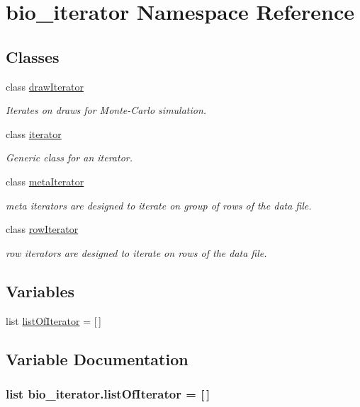 \hypertarget{namespacebio__iterator}{\section{bio\+\_\+iterator Namespace Reference}
\label{namespacebio__iterator}
}
\subsection*{Classes}
\begin{DoxyCompactItemize}
\item 
class \hyperlink{classbio__iterator_1_1draw_iterator}{draw\+Iterator}
\begin{DoxyCompactList}\small\item\em Iterates on draws for Monte-\/\+Carlo simulation. \end{DoxyCompactList}\item 
class \hyperlink{classbio__iterator_1_1iterator}{iterator}
\begin{DoxyCompactList}\small\item\em Generic class for an iterator. \end{DoxyCompactList}\item 
class \hyperlink{classbio__iterator_1_1meta_iterator}{meta\+Iterator}
\begin{DoxyCompactList}\small\item\em meta iterators are designed to iterate on group of rows of the data file. \end{DoxyCompactList}\item 
class \hyperlink{classbio__iterator_1_1row_iterator}{row\+Iterator}
\begin{DoxyCompactList}\small\item\em row iterators are designed to iterate on rows of the data file. \end{DoxyCompactList}\end{DoxyCompactItemize}
\subsection*{Variables}
\begin{DoxyCompactItemize}
\item 
list \hyperlink{namespacebio__iterator_a2d3f53d80176e4d2ece5f09a7d999bf9}{list\+Of\+Iterator} = \mbox{[}$\,$\mbox{]}
\end{DoxyCompactItemize}


\subsection{Variable Documentation}
\hypertarget{namespacebio__iterator_a2d3f53d80176e4d2ece5f09a7d999bf9}{
\subsubsection[{list\+Of\+Iterator}]{\setlength{\rightskip}{0pt plus 5cm}list bio\+\_\+iterator.\+list\+Of\+Iterator = \mbox{[}$\,$\mbox{]}}}\label{namespacebio__iterator_a2d3f53d80176e4d2ece5f09a7d999bf9}
